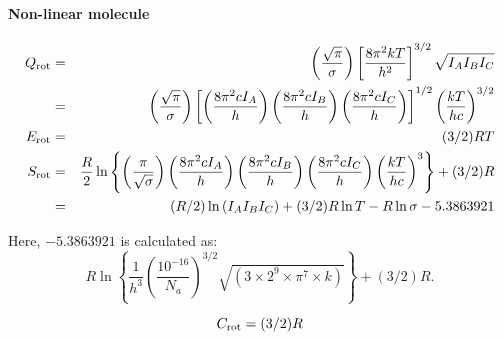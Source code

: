\paragraph*{Non-linear molecule}
\begin{eqnarray}
 Q_{\rm rot} & = & \left( \frac{\sqrt{\pi}}{\sigma}\right)
 \left[ \frac{8\pi^2kT}{h^2}\right]^{3/2} \sqrt{I_AI_BI_C} \nonumber\\
& = & \left( \frac{\sqrt{\pi}}{\sigma}\right)
\left[ \left( \frac{8\pi^2cI_A}{h} \right)
       \left( \frac{8\pi^2cI_B}{h} \right)
       \left( \frac{8\pi^2cI_C}{h} \right) \right]^{1/2}
\left(\frac{kT}{hc}\right)^{3/2} \nonumber\label{eq15} \\
 E_{\rm rot} & = & (3/2)RT \nonumber\label{eq16} \\
 S_{\rm rot} & = & \frac{R}{2} \ln\left\{
 \left(\frac{\pi}{\sqrt{\sigma}}\right) \left(\frac{8\pi^2cI_A}{h}\right)
 \left(\frac{8\pi^2cI_B}{h}\right)      \left(\frac{8\pi^2cI_C}{h}\right)
 \left(\frac{kT}{hc}\right)^3\right\} + (3/2)R  \nonumber\label{eq17} \\
& = & (R/2) \ln{(I_A I_B I_C)} + (3/2) R\ln{T}  - R \ln{\sigma} - 5.3863921
\nonumber
\end{eqnarray}

Here, $-5.386 3921$ is calculated as:
$$ R \ln\left\{\frac{1}{h^3} \left(\frac{10^{-16}}{N_a}\right)^{3/2}
\sqrt{(3\times 2^9 \times \pi^7 \times k)}\right\} + (3/2)R.
$$

\begin{equation}
C_{\rm rot} = (3/2)R \nonumber\label{eq18}
\end{equation}

